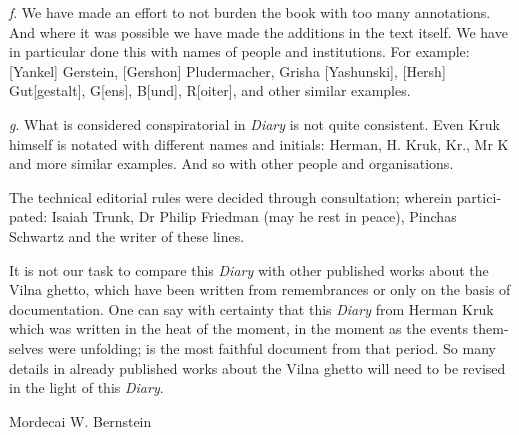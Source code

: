 \documentclass{article}
\begin{document}
\begin{pairs}
\begin{Leftside}
\begin{english}
\emph{f}. We have made an effort to not burden the book with too many annotations.
And where it was possible we have made the additions in the text itself. We have
in particular done this with names of people and institutions. For example:
[Yankel] Gerstein, [Gershon] Pludermacher, Grisha [Yashunski], [Hersh] Gut[gestalt], G[ens],
B[und], R[oiter], and other similar examples.

\emph{g}. What is considered conspiratorial in \emph{Diary} is not quite consistent.
Even Kruk himself is notated with different names and initials: Herman, H. Kruk,
Kr., Mr K and more similar examples. And so with other people and organisations.

The technical editorial rules were decided through consultation; wherein participated:
Isaiah Trunk, Dr Philip Friedman (may he rest in peace), Pinchas Schwartz and the
writer of these lines. 

It is not our task to compare this \emph{Diary} with other published works about the Vilna ghetto,
which have been written from remembrances or only on the basis of documentation. One can say with certainty
that this \emph{Diary} from Herman Kruk which was written in the heat of the moment, in the moment as the events themselves
were unfolding; is the most faithful document from that period. So many details in already published works about the Vilna
ghetto will need to be revised in the light of this \emph{Diary}.

Mordecai W. Bernstein

\endnumbering
\end{english}
\end{Leftside}

\end{pairs}
\Columns

\newpage
\end{document}
